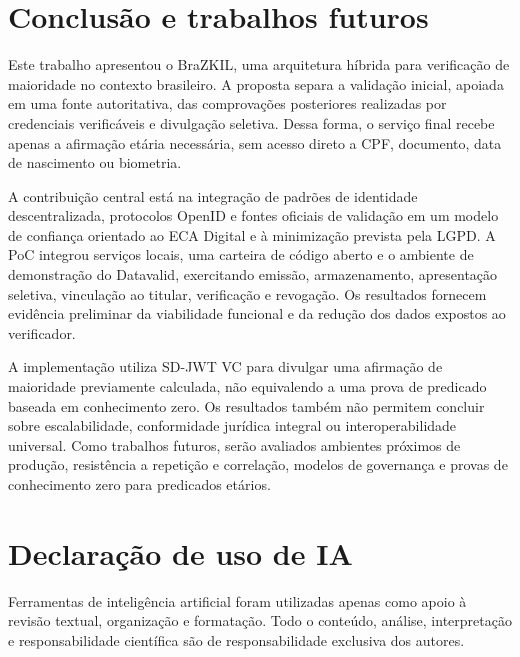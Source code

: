 \documentclass[12pt]{article}
\begin{document}
\section{Conclusão e trabalhos futuros}
\label{sec:conclusao}



Este trabalho apresentou o BraZKIL, uma arquitetura híbrida para
verificação de maioridade no contexto brasileiro. A proposta separa a
validação inicial, apoiada em uma fonte autoritativa, das comprovações
posteriores realizadas por credenciais verificáveis e divulgação
seletiva. Dessa forma, o serviço final recebe apenas a afirmação etária
necessária, sem acesso direto a CPF, documento, data de nascimento ou
biometria.

A contribuição central está na integração de padrões de identidade
descentralizada, protocolos OpenID e fontes oficiais de validação em um
modelo de confiança orientado ao ECA Digital e à minimização prevista
pela LGPD. A PoC integrou serviços locais, uma carteira de código aberto
e o ambiente de demonstração do Datavalid, exercitando emissão,
armazenamento, apresentação seletiva, vinculação ao titular, verificação
e revogação. Os resultados fornecem evidência preliminar da viabilidade
funcional e da redução dos dados expostos ao verificador.

A implementação utiliza SD-JWT VC para divulgar uma afirmação de maioridade previamente calculada, não equivalendo a uma prova de predicado baseada em conhecimento zero. Os resultados também não permitem concluir sobre escalabilidade, conformidade jurídica integral ou interoperabilidade universal. Como trabalhos futuros, serão avaliados ambientes próximos de produção,
resistência a repetição e correlação, modelos de governança e provas de
conhecimento zero para predicados etários. 

\section*{Declaração de uso de IA}
Ferramentas de inteligência artificial foram utilizadas apenas como apoio à revisão textual, organização e formatação. Todo o conteúdo, análise, interpretação e responsabilidade científica são de responsabilidade exclusiva dos autores.



\end{document}
